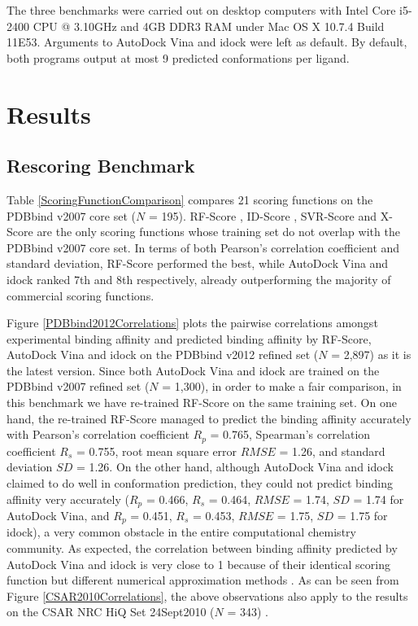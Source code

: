 \documentclass[10pt]{article}
\begin{document}
The three benchmarks were carried out on desktop computers with Intel Core i5-2400 CPU @ 3.10GHz and 4GB DDR3 RAM under Mac OS X 10.7.4 Build 11E53. Arguments to AutoDock Vina and idock were left as default. By default, both programs output at most 9 predicted conformations per ligand.

\section*{Results}

\subsection*{Rescoring Benchmark}
Table \ref{ScoringFunctionComparison} compares 21 scoring functions on the PDBbind v2007 core set ($N$ = 195). RF-Score \cite{564}, ID-Score \cite{1305}, SVR-Score \cite{1295} and X-Score \cite{573} are the only scoring functions whose training set do not overlap with the PDBbind v2007 core set. In terms of both Pearson's correlation coefficient and standard deviation, RF-Score performed the best, while AutoDock Vina and idock ranked 7th and 8th respectively, already outperforming the majority of commercial scoring functions.

Figure \ref{PDBbind2012Correlations} plots the pairwise correlations amongst experimental binding affinity and predicted binding affinity by RF-Score, AutoDock Vina and idock on the PDBbind v2012 \cite{529,530} refined set ($N$ = 2,897) as it is the latest version. Since both AutoDock Vina and idock are trained on the PDBbind v2007 refined set ($N$ = 1,300), in order to make a fair comparison, in this benchmark we have re-trained RF-Score on the same training set. On one hand, the re-trained RF-Score managed to predict the binding affinity accurately with Pearson's correlation coefficient $R_p$ = 0.765, Spearman's correlation coefficient $R_s$ = 0.755, root mean square error $RMSE$ = 1.26, and standard deviation $SD$ = 1.26. On the other hand, although AutoDock Vina and idock claimed to do well in conformation prediction, they could not predict binding affinity very accurately ($R_p$ = 0.466, $R_s$ = 0.464, $RMSE$ = 1.74, $SD$ = 1.74 for AutoDock Vina, and $R_p$ = 0.451, $R_s$ = 0.453, $RMSE$ = 1.75, $SD$ = 1.75 for idock), a very common obstacle in the entire computational chemistry community. As expected, the correlation between binding affinity predicted by AutoDock Vina and idock is very close to 1 because of their identical scoring function but different numerical approximation methods \cite{1153}. As can be seen from Figure \ref{CSAR2010Correlations}, the above observations also apply to the results on the CSAR NRC HiQ Set 24Sept2010 ($N$ = 343) \cite{857,960}.
\end{document}
